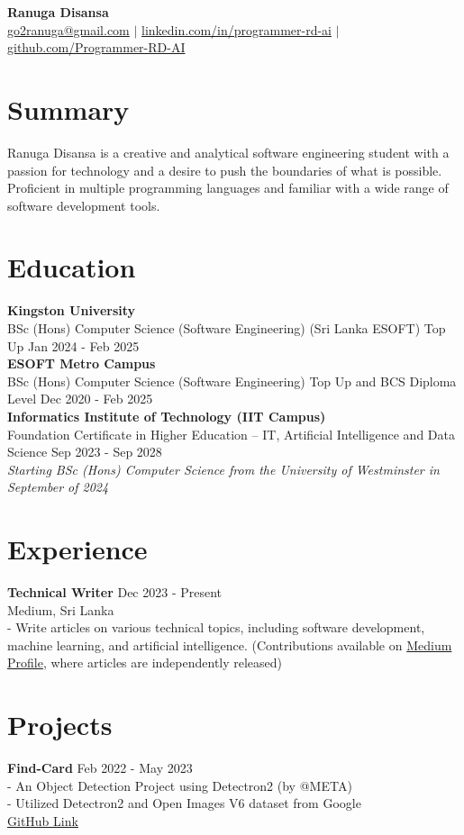 \documentclass[10pt,letterpaper]{article}
\begin{document}
\noindent
{\LARGE \textbf{Ranuga Disansa}} \\
\href{mailto:go2ranuga@gmail.com}{go2ranuga@gmail.com} $\vert$ \href{https://www.linkedin.com/in/programmer-rd-ai/}{linkedin.com/in/programmer-rd-ai} $\vert$ \href{https://github.com/Programmer-RD-AI}{github.com/Programmer-RD-AI}

\section*{Summary}
Ranuga Disansa is a creative and analytical software engineering student with a passion for technology and a desire to push the boundaries of what is possible. Proficient in multiple programming languages and familiar with a wide range of software development tools.

\section*{Education}
\textbf{Kingston University} \\
BSc (Hons) Computer Science (Software Engineering) (Sri Lanka ESOFT) Top Up \hfill Jan 2024 - Feb 2025 \\
\textbf{ESOFT Metro Campus} \\
BSc (Hons) Computer Science (Software Engineering) Top Up and BCS Diploma Level \hfill Dec 2020 - Feb 2025 \\
\textbf{Informatics Institute of Technology (IIT Campus)} \\
Foundation Certificate in Higher Education – IT, Artificial Intelligence and Data Science \hfill Sep 2023 - Sep 2028 \\
\textit{Starting BSc (Hons) Computer Science from the University of Westminster in September of 2024}

\section*{Experience}
\textbf{Technical Writer} \hfill Dec 2023 - Present \\
Medium, Sri Lanka \\
- Write articles on various technical topics, including software development, machine learning, and artificial intelligence. (Contributions available on \href{https://medium.com/@Programmer-RD-AI}{Medium Profile}, where articles are independently released)

\section*{Projects}
\textbf{Find-Card} \hfill Feb 2022 - May 2023 \\
- An Object Detection Project using Detectron2 (by @META) \\
- Utilized Detectron2 and Open Images V6 dataset from Google \\
\href{https://github.com/Programmer-RD-AI/Find-Card}{GitHub Link}
\end{document}
